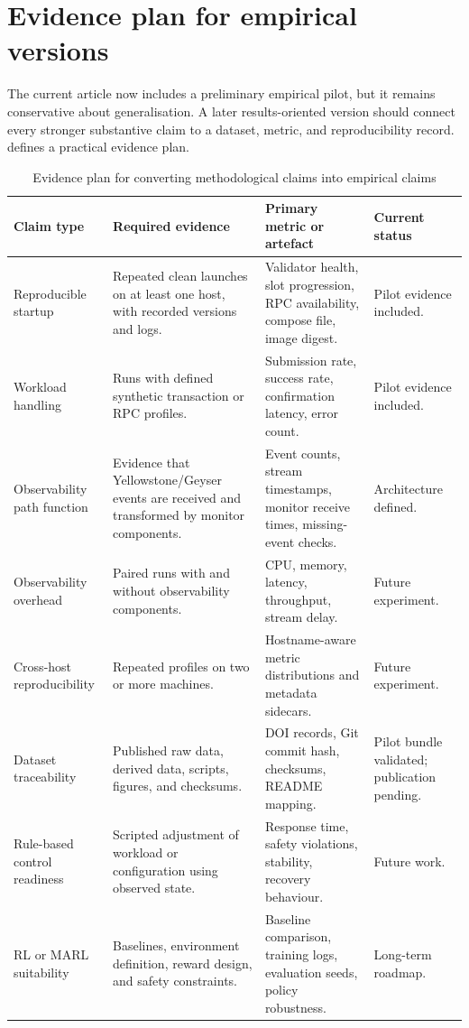 \documentclass[11pt,a4paper]{article}
\begin{document}
\section{Evidence plan for empirical versions}
\label{sec:evidence-plan}

The current article now includes a preliminary empirical pilot, but it remains conservative about generalisation. A later results-oriented version should connect every stronger substantive claim to a dataset, metric, and reproducibility record.  defines a practical evidence plan.

\begin{table}[H]
\centering
\caption{Evidence plan for converting methodological claims into empirical claims}
\label{tab:evidence-plan}
\begin{tabularx}{\textwidth}{L{3.4cm}Y Y L{2.5cm}}
\toprule
\textbf{Claim type} & \textbf{Required evidence} & \textbf{Primary metric or artefact} & \textbf{Current status} \\
\midrule
Reproducible startup & Repeated clean launches on at least one host, with recorded versions and logs. & Validator health, slot progression, RPC availability, compose file, image digest. & Pilot evidence included. \\
Workload handling & Runs with defined synthetic transaction or RPC profiles. & Submission rate, success rate, confirmation latency, error count. & Pilot evidence included. \\
Observability path function & Evidence that Yellowstone/Geyser events are received and transformed by monitor components. & Event counts, stream timestamps, monitor receive times, missing-event checks. & Architecture defined. \\
Observability overhead & Paired runs with and without observability components. & CPU, memory, latency, throughput, stream delay. & Future experiment. \\
Cross-host reproducibility & Repeated profiles on two or more machines. & Hostname-aware metric distributions and metadata sidecars. & Future experiment. \\
Dataset traceability & Published raw data, derived data, scripts, figures, and checksums. & DOI records, Git commit hash, checksums, README mapping. & Pilot bundle validated; publication pending. \\
Rule-based control readiness & Scripted adjustment of workload or configuration using observed state. & Response time, safety violations, stability, recovery behaviour. & Future work. \\
RL or MARL suitability & Baselines, environment definition, reward design, and safety constraints. & Baseline comparison, training logs, evaluation seeds, policy robustness. & Long-term roadmap. \\
\bottomrule
\end{tabularx}
\end{table}
\end{document}
